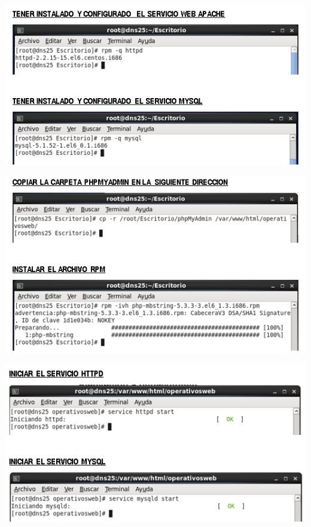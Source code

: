 \begin{itemize}
		\begin{center}
		\includegraphics[width=15cm]{./Imagenes/d}
		\end{center}
\end{itemize}	
	\begin{itemize}
		\begin{center}
		\includegraphics[width=15cm]{./Imagenes/e}
		\end{center}
\end{itemize}

	\begin{itemize}
		\begin{center}
		\includegraphics[width=15cm]{./Imagenes/f}
		\end{center}
\end{itemize}
\\\
\\\
\\\
